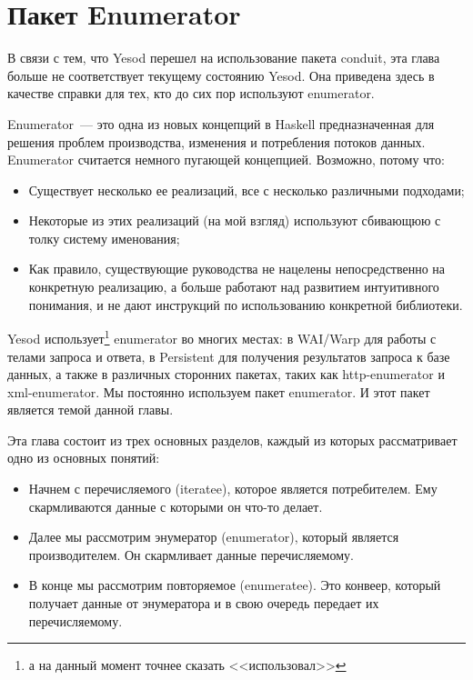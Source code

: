\chapter{Пакет Enumerator}\label{chap:enumerator}


\begin{remark}
В связи с тем, что Yesod перешел на использование пакета conduit, эта глава больше не соответствует текущему состоянию Yesod. Она приведена здесь в качестве справки для тех, кто до сих пор используют enumerator.
\end{remark}

Enumerator~--- это одна из новых концепций в Haskell предназначенная для решения проблем производства, изменения и потребления потоков данных. Enumerator считается немного пугающей концепцией. Возможно, потому что:

\begin{itemize}
\item Существует несколько ее реализаций, все с несколько различными подходами;
\item Некоторые из этих реализаций (на мой взгляд) используют сбивающюю с толку систему именования;
\item Как правило, существующие руководства не нацелены непосредственно на конкретную реализацию, а больше работают над развитием интуитивного понимания, и не дают инструкций по использованию конкретной библиотеки.
\end{itemize}

Yesod использует\footnote{а на данный момент точнее сказать <<использовал>>} enumerator во многих местах: в WAI/Warp для работы с телами запроса и ответа, в Persistent для получения результатов запроса к базе данных, а также в различных сторонних пакетах, таких как http-enumerator и xml-enumerator. Мы постоянно используем пакет enumerator. И этот пакет является темой данной главы.

Эта глава состоит из трех основных разделов, каждый из которых рассматривает одно из основных понятий:

\begin{itemize}
\item Начнем с перечисляемого (iteratee), которое является потребителем. Ему скармливаются данные с которыми он что-то делает.
\item Далее мы рассмотрим энумератор (enumerator), который является производителем. Он скармливает данные перечисляемому.
\item В конце мы рассмотрим повторяемое (enumeratee). Это конвеер, который получает данные от энумератора и в свою очередь передает их перечисляемому.
\end{itemize}

